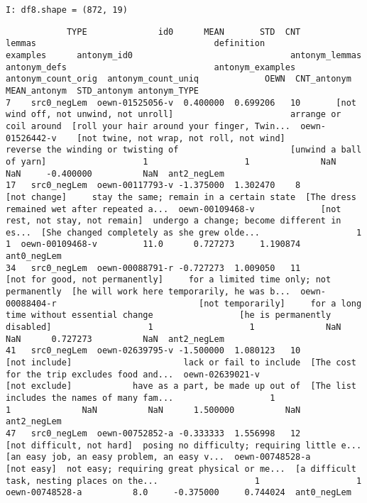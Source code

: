 \documentclass[a4paper,10pt,onecolumn,oneside,openright]{article}
\begin{document}
\begin{verbatim}
I: df8.shape = (872, 19)
\end{verbatim}

\begin{verbatim}
            TYPE              id0      MEAN       STD  CNT                                       lemmas                                   definition                                     examples      antonym_id0                               antonym_lemmas                                 antonym_defs                             antonym_examples  antonym_count_orig  antonym_count_uniq             OEWN  CNT_antonym  MEAN_antonym  STD_antonym antonym_TYPE
7    src0_negLem  oewn-01525056-v  0.400000  0.699206   10       [not wind off, not unwind, not unroll]                       arrange or coil around  [roll your hair around your finger, Twin...  oewn-01526442-v    [not twine, not wrap, not roll, not wind]           reverse the winding or twisting of                      [unwind a ball of yarn]                   1                   1              NaN          NaN     -0.400000          NaN  ant2_negLem
17   src0_negLem  oewn-00117793-v -1.375000  1.302470    8                                 [not change]     stay the same; remain in a certain state  [The dress remained wet after repeated a...  oewn-00109468-v             [not rest, not stay, not remain]  undergo a change; become different in es...  [She changed completely as she grew olde...                   1                   1  oewn-00109468-v         11.0      0.727273     1.190874  ant0_negLem
34   src0_negLem  oewn-00088791-r -0.727273  1.009050   11              [not for good, not permanently]     for a limited time only; not permanently  [he will work here temporarily, he was b...  oewn-00088404-r                            [not temporarily]     for a long time without essential change                 [he is permanently disabled]                   1                   1              NaN          NaN      0.727273          NaN  ant2_negLem
41   src0_negLem  oewn-02639795-v -1.500000  1.080123   10                                [not include]                      lack or fail to include  [The cost for the trip excludes food and...  oewn-02639021-v                                [not exclude]            have as a part, be made up out of  [The list includes the names of many fam...                   1                   1              NaN          NaN      1.500000          NaN  ant2_negLem
47   src0_negLem  oewn-00752852-a -0.333333  1.556998   12                    [not difficult, not hard]  posing no difficulty; requiring little e...  [an easy job, an easy problem, an easy v...  oewn-00748528-a                                   [not easy]  not easy; requiring great physical or me...  [a difficult task, nesting places on the...                   1                   1  oewn-00748528-a          8.0     -0.375000     0.744024  ant0_negLem

\end{verbatim}
\end{document}

